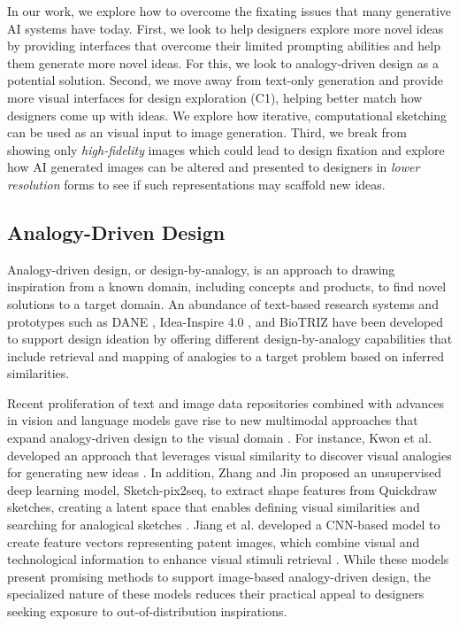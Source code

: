 \documentclass[sigconf, screen]{acmart}
\begin{document}
In our work, we explore how to overcome the fixating issues that many generative AI systems have today.
First, we look to help designers explore more novel ideas by providing interfaces that overcome their limited prompting abilities and help them generate more novel ideas.
For this, we look to analogy-driven design as a potential solution.
Second, we move away from text-only generation and provide more visual interfaces for design exploration (C1), helping better match how designers come up with ideas.
We explore how iterative, computational sketching can be used as an visual input to image generation.
Third, we break from showing only \textit{high-fidelity} images which could lead to design fixation and explore how AI generated images can be altered and presented to designers in \textit{lower resolution} forms to see if such representations may scaffold new ideas.

\subsection{Analogy-Driven Design}
Analogy-driven design, or design-by-analogy, is an approach to drawing inspiration from a known domain, including concepts and products, to find novel solutions to a target domain. An abundance of text-based research systems and prototypes such as DANE \cite{DANE}, Idea-Inspire 4.0 \cite{siddharth2018evaluating}, and BioTRIZ \cite{BioTRIZ} have been developed to support design ideation by offering different design-by-analogy capabilities that include retrieval and mapping of analogies to a target problem based on inferred similarities. 

Recent proliferation of text and image data repositories combined with advances in vision and language models gave rise to new multimodal approaches that expand analogy-driven design to the visual domain \cite{jiang2022data}. For instance, Kwon et al. developed an approach that leverages visual similarity to discover visual analogies for generating new ideas \cite{kwon2019visual}. In addition, Zhang and Jin proposed an unsupervised deep learning model, Sketch-pix2seq, to extract shape features from Quickdraw sketches, creating a latent space that enables defining visual similarities and searching for analogical sketches \cite{zhang2020unsupervised}. Jiang et al. developed a CNN-based model to create feature vectors representing patent images, which combine visual and technological information to enhance visual stimuli retrieval \cite{jiang2021deriving}. While these models present promising methods to support image-based analogy-driven design, the specialized nature of these models reduces their practical appeal to designers seeking exposure to out-of-distribution inspirations.
\end{document}
